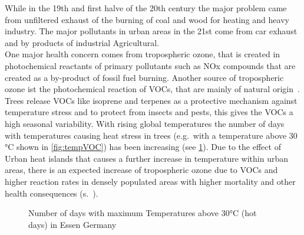 \documentclass[12pt,a4paper, english,twoside]{article}
\begin{document}
      While in the 19th and first halve of the 20th century the major problem came from unfiltered exhaust of the burning of coal and wood for heating and heavy industry.
      The major pollutants in urban areas in the 21st come from car exhaust and by products of industrial Agricultural. %
      \\
      One major health concern comes from tropospheric ozone, that is created in photochemical reactants of primary pollutants such as NOx compounds that are created as a by-product of fossil fuel burning. 
      Another source of tropospheric ozone ist the photochemical reaction of \glspl{VOC}, that are mainly of natural origin~\cite{Kansal2009}.
      Trees release VOCs like isoprene and terpenes as a protective mechanism against temperature stress and to protect from insects and pests, this gives the \glspl{VOC}
      a high seasonal variability. 
      With rising global temperatures the number of days with temperatures causing heat stress in trees (e.g.\ with a temperature above 30 °C shown in \cref{fig:tempVOC}) has been increasing (see \cref{fig:ubaTemp}).%
      Due to the effect of Urban heat islands that causes a further increase in temperature within urban areas,  there is an expected increase of tropospheric ozone due to \glspl{VOC} and higher reaction rates in densely populated areas with higher mortality and other health consequences (s.~\cite{Ebi2008}).\\
      \begin{figure}[!htbp]
        \begin{center}
          
          \caption{Number of days with maximum Temperatures above 30°C (hot days) in Essen Germany\label{fig:ubaTemp}}
        \end{center}
      \end{figure}
\end{document}
